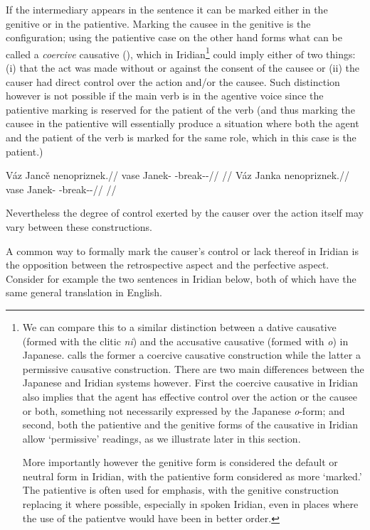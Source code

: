 If the intermediary appears in the sentence it can be marked either in the genitive or in the patientive. Marking the causee in the genitive is the  configuration; using the patientive case on the other hand forms what can be called a \emph{coercive} causative (\cite{shibatani1990,lehmann2006}), which in Iridian\footnote{We can compare this to a similar distinction between a dative causative (formed with the clitic \emph{ni}) and the accusative causative (formed with \emph{o}) in Japanese. \textcite{lehmann2006} calls the former a coercive causative construction while the latter a permissive causative construction. There are two main differences between the Japanese and Iridian systems however. First the coercive causative in Iridian also implies that the agent has effective control over the action or the causee or both, something not necessarily expressed by the Japanese \emph{o}-form; and second, both the patientive and the genitive forms of the causative in Iridian allow `permissive' readings, as we illustrate later in this section.

More importantly however the genitive form is considered the default or neutral form in Iridian, with the patientive form considered as more `marked.' The patientive is often used for emphasis, with the genitive construction replacing it where possible, especially in spoken Iridian, even in places where the use of the patientve would have been in better order.
}
could imply either of two things: (i) that the act was made without or against the consent of the causee or (ii) the causer had direct control over the action and/or the causee. Such distinction however is not possible if the main verb is in the agentive voice since the patientive marking is reserved for the patient of the verb (and thus marking the causee in the patientive will essentially produce a situation where both the agent and the patient of the verb is marked for the same role, which in this case is the patient.)

\pex
\a
\begingl
\gla Váz Janc\v{e} nenopriznek.//
\glb vase Janek-\Gen{} \Caus{}-break-\Pv{}-\Pf{}//
\glft {}//
\endgl
\a
\begingl
\gla Váz Janka nenopriznek.//
\glb vase Janek-\Acc{} \Caus{}-break-\Pv{}-\Pf{}//
\glft {}//
\endgl
\xe


Nevertheless the degree of control exerted by the causer over the action itself may vary between these constructions.

A common way to formally mark the causer's control or lack thereof in Iridian is the opposition between the retrospective aspect and the perfective aspect. Consider for example the two sentences in Iridian below, both of which have the same general translation in English.

